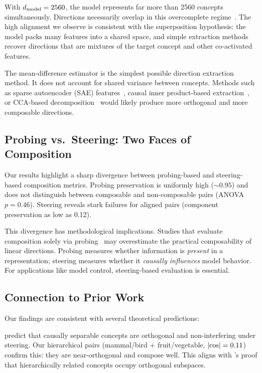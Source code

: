 With $d_{\text{model}} = 2560$, the model represents far more than 2560 concepts
simultaneously. Directions necessarily overlap in this overcomplete
regime~\citep{elhage2022superposition}. The high alignment we observe is
consistent with the superposition hypothesis: the model packs many features
into a shared space, and simple extraction methods recover directions that are
mixtures of the target concept and other co-activated features.

The mean-difference estimator is the simplest possible direction extraction
method. It does not account for shared variance between concepts. Methods such
as sparse autoencoder (SAE) features~\citep{chalnev2024improving}, causal inner
product-based extraction~\citep{park2023linear}, or CCA-based
decomposition~\citep{guo2025quantifying} would likely produce more orthogonal
and more composable directions.

\subsection{Probing vs.\ Steering: Two Faces of Composition}

Our results highlight a sharp divergence between probing-based and
steering-based composition metrics. Probing preservation is uniformly high
(${\sim}0.95$) and does not distinguish between composable and non-composable
pairs (ANOVA $p = 0.46$). Steering reveals stark failures for aligned pairs
(component preservation as low as 0.12).

This divergence has methodological implications. Studies that evaluate
composition solely via probing~\citep{park2024geometry, marks2023geometry}
may overestimate the practical composability of linear directions. Probing
measures whether information is \emph{present} in a representation; steering
measures whether it \emph{causally influences} model behavior. For applications
like model control, steering-based evaluation is essential.

\subsection{Connection to Prior Work}

Our findings are consistent with several theoretical predictions:

\citet{park2023linear} predict that causally separable concepts are
orthogonal and non-interfering under steering. Our hierarchical pairs
(mammal/bird + fruit/vegetable, $|\text{cos}| = 0.11$) confirm this: they are
near-orthogonal and compose well. This aligns with \citet{park2024geometry}'s
proof that hierarchically related concepts occupy orthogonal subspaces.

